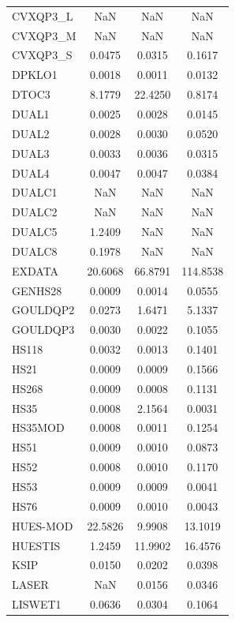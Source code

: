 \begin{longtable}{lccc}
CVXQP3\_L &      NaN &      NaN &      NaN \\
CVXQP3\_M &      NaN &      NaN &      NaN \\
CVXQP3\_S &   0.0475 &   0.0315 &   0.1617 \\
DPKLO1   &   0.0018 &   0.0011 &   0.0132 \\
DTOC3    &   8.1779 &  22.4250 &   0.8174 \\
DUAL1    &   0.0025 &   0.0028 &   0.0145 \\
DUAL2    &   0.0028 &   0.0030 &   0.0520 \\
DUAL3    &   0.0033 &   0.0036 &   0.0315 \\
DUAL4    &   0.0047 &   0.0047 &   0.0384 \\
DUALC1   &      NaN &      NaN &      NaN \\
DUALC2   &      NaN &      NaN &      NaN \\
DUALC5   &   1.2409 &      NaN &      NaN \\
DUALC8   &   0.1978 &      NaN &      NaN \\
EXDATA   &  20.6068 &  66.8791 & 114.8538 \\
GENHS28  &   0.0009 &   0.0014 &   0.0555 \\
GOULDQP2 &   0.0273 &   1.6471 &   5.1337 \\
GOULDQP3 &   0.0030 &   0.0022 &   0.1055 \\
HS118    &   0.0032 &   0.0013 &   0.1401 \\
HS21     &   0.0009 &   0.0009 &   0.1566 \\
HS268    &   0.0009 &   0.0008 &   0.1131 \\
HS35     &   0.0008 &   2.1564 &   0.0031 \\
HS35MOD  &   0.0008 &   0.0011 &   0.1254 \\
HS51     &   0.0009 &   0.0010 &   0.0873 \\
HS52     &   0.0008 &   0.0010 &   0.1170 \\
HS53     &   0.0009 &   0.0009 &   0.0041 \\
HS76     &   0.0009 &   0.0010 &   0.0043 \\
HUES-MOD &  22.5826 &   9.9908 &  13.1019 \\
HUESTIS  &   1.2459 &  11.9902 &  16.4576 \\
KSIP     &   0.0150 &   0.0202 &   0.0398 \\
LASER    &      NaN &   0.0156 &   0.0346 \\
LISWET1  &   0.0636 &   0.0304 &   0.1064 \\

\end{longtable}
